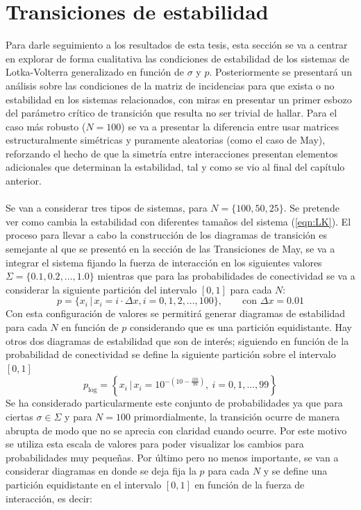 \section{Transiciones de estabilidad}

Para darle seguimiento a los resultados de esta tesis, esta sección se va a centrar en explorar de forma cualitativa las condiciones de estabilidad de los sistemas de Lotka-Volterra generalizado en función de $\sigma$ y $p$. Posteriormente se presentará un análisis sobre las condiciones de la matriz de incidencias para que exista o no estabilidad en los sistemas relacionados, con miras en presentar un primer esbozo del parámetro crítico de transición que resulta no ser trivial de hallar. Para el caso más robusto ($N=100$) se va a presentar la diferencia entre usar matrices estructuralmente simétricas y puramente aleatorias (como el caso de May), reforzando el hecho de que la simetría entre interacciones presentan elementos adicionales que determinan la estabilidad, tal y como se vio al final del capítulo anterior.\\
\\
Se van a considerar tres tipos de sistemas, para $N=\{100,50,25\}$. Se pretende ver como cambia la estabilidad con diferentes tamaños del sistema (\ref{eqn:LK}). El proceso para llevar a cabo la construcción de los diagramas de transición es semejante al que se presentó en la sección de las Transiciones de May, se va a integrar el sistema fijando la fuerza de interacción en los siguientes valores ${\Sigma}=\{0.1,0.2,...,1.0\}$ mientras que para las probabilidades de conectividad se va a considerar la siguiente partición del intervalo $[0,1]$ para cada $N$:
\begin{equation}\label{eqn:particionLin}
	p = \{x_i\, |\, x_i=i\cdot\Delta x, i=0,1,2,...,100\},\qquad\text{con }\Delta x=0.01
\end{equation}
Con esta configuración de valores se permitirá generar diagramas de estabilidad para cada $N$ en función de $p$ considerando que es una partición equidistante. Hay otros dos diagramas de estabilidad que son de interés; siguiendo en función de la probabilidad de conectividad se define la siguiente partición sobre el intervalo $[0,1]$
\begin{equation}\label{eqn:particionLog}
	p_{\log}=\left \{ x_i\, |\, x_i=10^{-\left (10-\frac{10i}{99}\right )},\ i=0,1,...,99\right \}
\end{equation}
Se ha considerado particularmente este conjunto de probabilidades ya que para ciertas $\sigma\in\Sigma$ y para $N=100$ primordialmente, la transición ocurre de manera abrupta de modo que no se aprecia con claridad cuando ocurre. Por este motivo se utiliza esta escala de valores para poder visualizar los cambios para probabilidades muy pequeñas. Por último pero no menos importante, se van a considerar diagramas en donde se deja fija la $p$ para cada $N$ y se define una partición equidistante en el intervalo $[0,1]$ en función de la fuerza de interacción, es decir:
